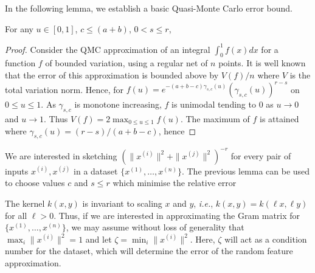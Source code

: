 In the following lemma, we establish a basic Quasi-Monte Carlo error bound.

\begin{lemma}\label{QMC basic lemma} 
For any $u\in[0,1]$, $c\leq (a+b)$, $0<s \le r $,
\end{lemma}

\begin{proof}
Consider the QMC approximation of an integral $\int_0^1 f(x)dx$ for a function $f$ of bounded variation, using a regular net of $n$ points. It is well known that the error of this approximation is bounded above by $V(f)/n$ where $V$ is the total variation norm. Hence, 
for $f(u)= e^{-(a+b-c)\gamma_{s,c}(u)} (\gamma_{s,c}(u))^{r-s}$ on $0\leq u\leq 1$. As $\gamma_{s,c}$ is monotone increasing, $f$ is unimodal tending to $0$ as $u\to 0$ and $u\to 1$. Thus $V(f)=2\max_{0\le u\le 1} f(u)$.
The maximum of $f$ is attained where $\gamma_{s,c}(u)= (r-s)/(a+b-c)$, hence 
\end{proof}

We are interested in sketching $( \| x^{(i)} \| ^2+ \| x^{(j)} \| ^2)^{-r}$ for every pair of inputs $x^{(i)}, x^{(j)}$ in a dataset $\{x^{(1)},\dots,x^{(n)}\}$. The previous lemma can be used to choose values $c$ and $s\le r$ which minimise the relative error

The kernel $k(x,y)$ is invariant to scaling $x$ and $y$, \emph{i.e.}, $k(x,y)=k(\ell x,\ell y)$ for all $\ell>0$. Thus, if we are interested in approximating the Gram matrix for $\{x^{(1)},\dots,x^{(n)}\}$, we may assume without loss of generality that $\max_i  \| x^{(i)} \| ^2 = 1$ and let $\zeta = \min_i  \| x^{(i)} \| ^2$. Here, $\zeta$ will act as a condition number for the dataset, which will determine the error of the random feature approximation.

